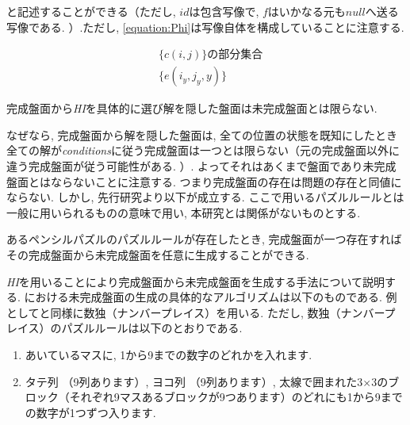 と記述することができる（ただし, $id$は包含写像で, $f$はいかなる元も$null$へ送る写像である. ）.ただし, \cref{equation:Phi}は写像自体を構成していることに注意する.

\begin{example}
  \begin{align*}
     & \{c(i,j)\}の部分集合  \\
     & \{e(i_y,j_y,y)\}
  \end{align*}
\end{example}

\begin{remark}\label{remark:HI}
  完成盤面から\textit{HI}を具体的に選び解を隠した盤面は未完成盤面とは限らない.
\end{remark}
なぜなら, 完成盤面から解を隠した盤面は, 全ての位置の状態を既知にしたとき全ての解が\textit{conditions}に従う完成盤面は一つとは限らない（元の完成盤面以外に違う完成盤面が従う可能性がある. ）. よってそれはあくまで盤面であり未完成盤面とはならないことに注意する. つまり完成盤面の存在は問題の存在と同値にならない. しかし, 先行研究より以下が成立する. ここで用いるパズルルールとは一般に用いられるものの意味で用い, 本研究とは関係がないものとする.
\begin{lemma}\label{lemma:CompleteBoard}
  あるペンシルパズルのパズルルールが存在したとき, 完成盤面が一つ存在すればその完成盤面から未完成盤面を任意に生成することができる.
\end{lemma}
\textit{HI}を用いることにより完成盤面から未完成盤面を生成する手法について説明する. \cite{Fujiwara2022}における未完成盤面の生成の具体的なアルゴリズムは以下のものである. 例として\cite{Fujiwara2022}と同様に数独（ナンバープレイス）を用いる. ただし, 数独（ナンバープレイス）のパズルルールは以下のとおりである. \cite{web:Sudoku}

\begin{enumerate}
  \item あいているマスに,  1から9までの数字のどれかを入れます.
  \item タテ列 （9列あります）,  ヨコ列 （9列あります）,  太線で囲まれた3$\times$3のブロック（それぞれ9マスあるブロックが9つあります）のどれにも1から9までの数字が1つずつ入ります.
\end{enumerate}


